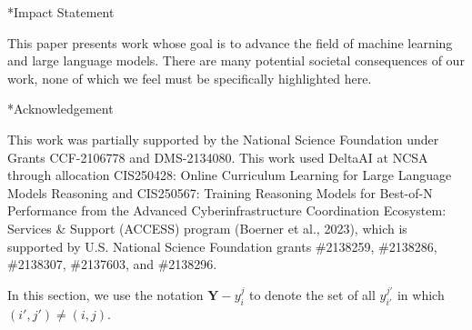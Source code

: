 \documentclass{article}
\makeatletter
\renewcommand{\vec}[1]{\mathbf{#1}}
\theoremstyle{plain}
\theoremstyle{definition}
\theoremstyle{remark}
\newlength{\secvspace}
\let\originalsection\section
\let\originalappendix\appendix
\renewcommand{\section}{\@ifstar{\@sectionstar}{\@sectionnormal}}
\newcommand{\@sectionnormal}[1]{%
  \vspace{-\secvspace}%
  \originalsection{#1}%
  \vspace{-\secvspace}%
}
\newcommand{\@sectionstar}[1]{%
  \vspace{-\secvspace}%
  \originalsection*{#1}%
  \vspace{-\secvspace}%
}
\newcommand{\restorenormalspacing}{%
  \setlength{\secvspace}{0pt}%
}
\renewcommand{\appendix}{%
  \restorenormalspacing%
  \originalappendix%
}
\makeatother
\begin{document}
\section*{Impact Statement}

This paper presents work whose goal is to advance the field of machine learning and large language models. There are many potential societal consequences of our work, none of which we feel must be specifically highlighted here.

\section*{Acknowledgement}

This work was partially supported by the National Science Foundation under Grants CCF-2106778 and DMS-2134080. This work used DeltaAI at NCSA through allocation CIS250428: Online Curriculum Learning for Large Language Models Reasoning and CIS250567: Training Reasoning Models for Best-of-N Performance from the Advanced Cyberinfrastructure Coordination Ecosystem: Services \& Support
(ACCESS) program (Boerner et al., 2023), which is supported by U.S. National Science Foundation
grants \#2138259, \#2138286, \#2138307, \#2137603, and \#2138296.




\newpage
\appendix
\onecolumn

\clearpage
\newpage

\section{Theoretical Proof}
\label{sec:appendix_proof}
In this section, we use the notation $\vec Y - y_i^j$ to denote the set of all $y_{i'}^{j'}$ in which $(i',j')\neq (i,j)$.
\end{document}

